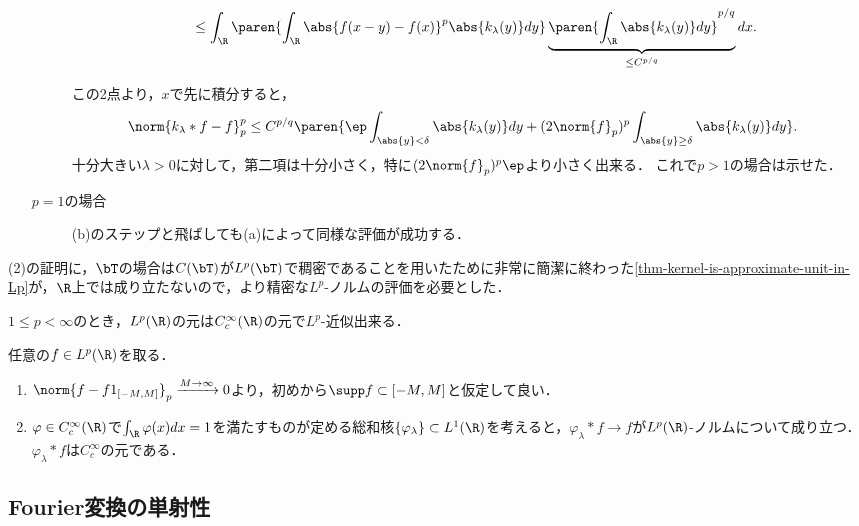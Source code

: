 \documentclass[uplatex,dvipdfmx]{jsreport}
\begin{document}
\begin{Proof}
\begin{enumerate}
\begin{description}
\begin{enumerate}
\begin{align*}
                    &\le\int_\R\paren{\int_\R\abs{f(x-y)-f(x)}^p\abs{k_\lambda(y)}dy}\underbrace{\paren{\int_\R\abs{k_\lambda(y)}dy}^{p/q}}_{\le C^{p/q}}dx.
                \end{align*}
            \end{enumerate}
            この2点より，$x$で先に積分すると，
            \begin{align*}
                \norm{k_\lambda*f-f}^p_p&\le C^{p/q}\paren{\ep\int_{\abs{y}<\delta}\abs{k_\lambda(y)}dy+(2\norm{f}_p)^{p}\int_{\abs{y}\ge\delta}\abs{k_\lambda(y)}dy}.
            \end{align*}
            十分大きい$\lambda>0$に対して，第二項は十分小さく，特に$(2\norm{f}_p)^p\ep$より小さく出来る．
            これで$p>1$の場合は示せた．
            \item[$p=1$の場合] (b)のステップと飛ばしても(a)によって同様な評価が成功する．
        \end{description}
    \end{enumerate}
\end{Proof}
\begin{remarks}
    (2)の証明に，$\bT$の場合は$C(\bT)$が$L^p(\bT)$で稠密であることを用いたために非常に簡潔に終わった\ref{thm-kernel-is-approximate-unit-in-Lp}が，$\R$上では成り立たないので，より精密な$L^p$-ノルムの評価を必要とした．
\end{remarks}

\begin{corollary}[試験関数の空間の稠密性]
    $1\le p<\infty$のとき，$L^p(\R)$の元は$C_c^\infty(\R)$の元で$L^p$-近似出来る．
\end{corollary}
\begin{Proof}任意の$f\in L^p(\R)$を取る．
    \begin{enumerate}
        \item $\norm{f-f1_{[-M,M]}}_p\xrightarrow{M\to\infty}0$より，初めから$\supp f\subset[-M,M]$と仮定して良い．
        \item $\varphi\in C_c^\infty(\R)$で$\int_\R\varphi(x)dx=1$を満たすものが定める総和核$\{\varphi_\lambda\}\subset L^1(\R)$を考えると，$\varphi_\lambda*f\to f$が$L^p(\R)$-ノルムについて成り立つ．
        $\varphi_\lambda*f$は$C^\infty_c$の元である．
    \end{enumerate}
\end{Proof}

\subsection{Fourier変換の単射性}
\end{document}
